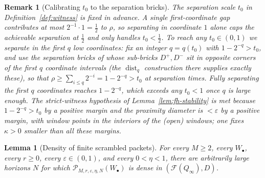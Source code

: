 \documentclass[11pt]{article}
\newtheorem{lemma}[theorem]{Lemma}
\newtheorem{remark}[theorem]{Remark}
\newcommand{\Q}{Q_\infty}
\newcommand{\F}{\mathcal{F}}
\newcommand{\dist}{\operatorname{dist}}
\begin{document}
\begin{remark}[Calibrating $t_0$ to the separation bricks]\label{rem:t0}
The separation scale $t_0$ in Definition~\ref{def:witness} is fixed in advance.  A single
first-coordinate gap contributes at most $2^{-1}\cdot1=\tfrac12$ to $\rho$, so separating
in coordinate $1$ alone caps the achievable separation at $\tfrac12$ and only handles
$t_0<\tfrac12$.  To reach any $t_0\in(0,1)$ we separate in the first $q$ low coordinates:
fix an integer $q=q(t_0)$ with $1-2^{-q}>t_0$, and use the separation bricks of
\cite[\S12]{Shmalo2026} whose sub-bricks $D^{+},D^{-}$ sit in opposite corners of the
first $q$ coordinate intervals (the $\dist_q$ construction there supplies exactly these),
so that $\rho\ge\sum_{i\le q}2^{-i}=1-2^{-q}>t_0$ at separation times.  Fully separating
the first $q$ coordinates reaches $1-2^{-q}$, which exceeds any $t_0<1$ once $q$ is large
enough.  The strict-witness hypothesis of Lemma~\ref{lem:fh-stability} is met because
$1-2^{-q}>t_0$ by a positive margin and the proximity diameter is $<\varepsilon$ by a
positive margin, with window points in the interiors of the (open) windows; one fixes
$\kappa>0$ smaller than all these margins.
\end{remark}

\begin{lemma}[Density of finite scrambled packets]\label{lem:packet-density}
For every \(M\ge2\), every \(W_\bullet\), every \(r\ge0\), every
\(\varepsilon\in(0,1)\), and every \(0<\eta<1\), there are arbitrarily large
horizons \(N\) for which
\(\mathcal P_{M,r,\varepsilon,\eta,N}(W_\bullet)\) is dense in \((\F(\Q),D)\).
\end{lemma}
\end{document}
